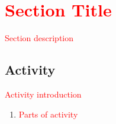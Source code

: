 
\section{\textcolor{red}{Section Title}}
\label{sec:sectiontitle}

\textcolor{red}{Section description}

\subsection*{Activity}

\textcolor{red}{Activity introduction}

\begin{enumerate}[\bf {\thesection}a.]
	\item \textcolor{red}{Parts of activity}
\end{enumerate}


